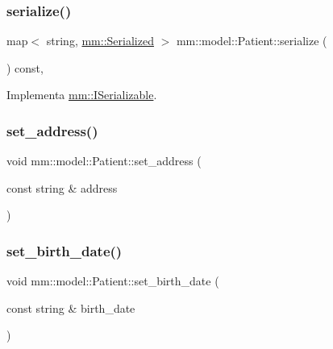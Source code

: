 \mbox{\label{classmm_1_1model_1_1_patient_ae3ac219cd109e8c53daaf9b2758c3a0e}} 
\subsubsection{\texorpdfstring{serialize()}{serialize()}}
{\footnotesize\ttfamily map$<$ string, \mbox{\hyperlink{structmm_1_1_serialized}{mm\+::\+Serialized}} $>$ mm\+::model\+::\+Patient\+::serialize (\begin{DoxyParamCaption}{ }\end{DoxyParamCaption}) const\hspace{0.3cm}{\ttfamily [override]}, {\ttfamily [virtual]}}



Implementa \mbox{\hyperlink{classmm_1_1_i_serializable_a20a59e2324c8dbf6fefe4d11ae89d0fb}{mm\+::\+I\+Serializable}}.

\mbox{\label{classmm_1_1model_1_1_patient_a4e19f86233b55b4dec59f947f1dfe32a}} 
\subsubsection{\texorpdfstring{set\+\_\+address()}{set\_address()}}
{\footnotesize\ttfamily void mm\+::model\+::\+Patient\+::set\+\_\+address (\begin{DoxyParamCaption}\item[{const string \&}]{address }\end{DoxyParamCaption})}

\mbox{\label{classmm_1_1model_1_1_patient_ad73008977024e6ca48e5c687eb27b996}} 
\subsubsection{\texorpdfstring{set\+\_\+birth\+\_\+date()}{set\_birth\_date()}}
{\footnotesize\ttfamily void mm\+::model\+::\+Patient\+::set\+\_\+birth\+\_\+date (\begin{DoxyParamCaption}\item[{const string \&}]{birth\+\_\+date }\end{DoxyParamCaption})}

